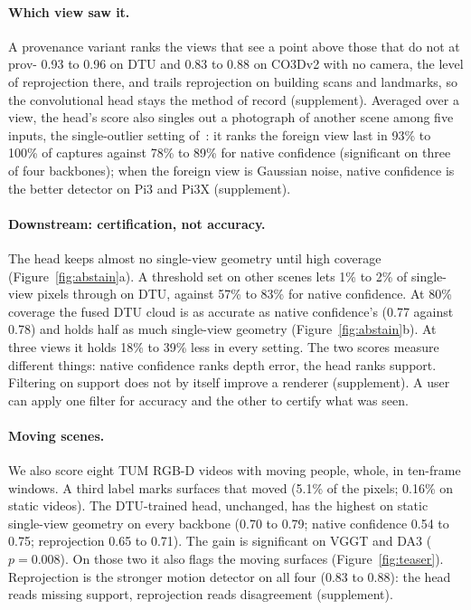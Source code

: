 \documentclass[10pt,twocolumn,letterpaper]{article}
\begin{document}
\paragraph{Which view saw it.}
A provenance variant ranks the views that see a point above those that do not at prov-\auroc{} 0.93 to 0.96 on DTU and 0.83 to 0.88 on CO3Dv2 with no camera, the level of reprojection there, and trails reprojection on building scans and landmarks, so the convolutional head stays the method of record (supplement). Averaged over a view, the head's score also singles out a photograph of another scene among five inputs, the single-outlier setting of~\cite{paul2026}: it ranks the foreign view last in 93\% to 100\% of captures against 78\% to 89\% for native confidence (significant on three of four backbones); when the foreign view is Gaussian noise, native confidence is the better detector on Pi3 and Pi3X (supplement).

\paragraph{Downstream: certification, not accuracy.}
The head keeps almost no single-view geometry until high coverage (Figure~\ref{fig:abstain}a). A threshold set on other scenes lets 1\% to 2\% of single-view pixels through on DTU, against 57\% to 83\% for native confidence. At 80\% coverage the fused DTU cloud is as accurate as native confidence's (0.77 against 0.78) and holds half as much single-view geometry (Figure~\ref{fig:abstain}b). At three views it holds 18\% to 39\% less in every setting. The two scores measure different things: native confidence ranks depth error, the head ranks support. Filtering on support does not by itself improve a renderer (supplement). A user can apply one filter for accuracy and the other to certify what was seen.

\paragraph{Moving scenes.}
We also score eight TUM RGB-D videos with moving people, whole, in ten-frame windows. A third label marks surfaces that moved (5.1\% of the pixels; 0.16\% on static videos). The DTU-trained head, unchanged, has the highest \auroc{} on static single-view geometry on every backbone (0.70 to 0.79; native confidence 0.54 to 0.75; reprojection 0.65 to 0.71). The gain is significant on VGGT and DA3 ($p=0.008$). On those two it also flags the moving surfaces (Figure~\ref{fig:teaser}). Reprojection is the stronger motion detector on all four (0.83 to 0.88): the head reads missing support, reprojection reads disagreement (supplement).
\end{document}
